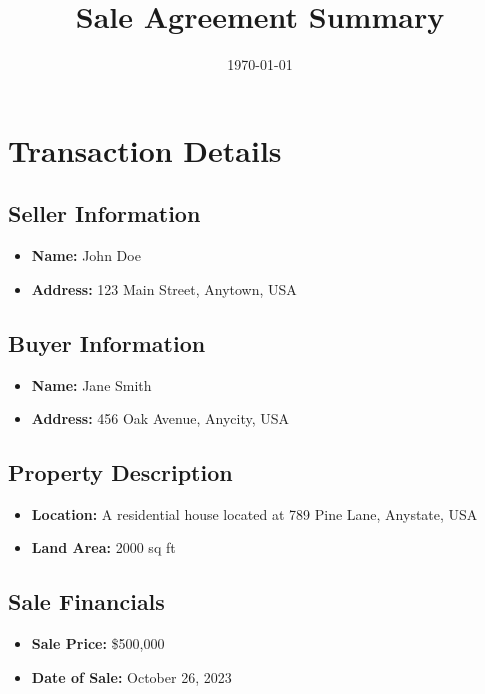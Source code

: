 \documentclass{article}
\title{Sale Agreement Summary}
\author{} %
\date{\today}
\begin{document}
\maketitle

\section*{Transaction Details}

\subsection*{Seller Information}
\begin{itemize}[leftmargin=2em]
    \item \textbf{Name:} John Doe
    \item \textbf{Address:} 123 Main Street, Anytown, USA
\end{itemize}

\subsection*{Buyer Information}
\begin{itemize}[leftmargin=2em]
    \item \textbf{Name:} Jane Smith
    \item \textbf{Address:} 456 Oak Avenue, Anycity, USA
\end{itemize}

\subsection*{Property Description}
\begin{itemize}[leftmargin=2em]
    \item \textbf{Location:} A residential house located at 789 Pine Lane, Anystate, USA
    \item \textbf{Land Area:} 2000 sq ft
\end{itemize}

\subsection*{Sale Financials}
\begin{itemize}[leftmargin=2em]
    \item \textbf{Sale Price:} \$500,000
    \item \textbf{Date of Sale:} October 26, 2023
\end{itemize}
\end{document}
